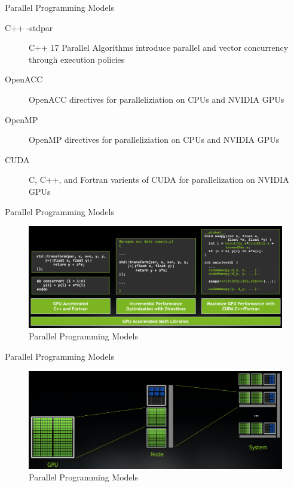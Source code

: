 \documentclass[aspectratio=169]{beamer}
\begin{document}
\begin{frame}{Parallel Programming Models}
\begin{description}
  \item[C++ -stdpar] C++ 17 Parallel Algorithms introduce parallel and vector concurrency through execution policies
  \item[OpenACC] OpenACC directives for paralleliziation on CPUs and NVIDIA GPUs
  \item[OpenMP] OpenMP directives for paralleliziation on CPUs and NVIDIA GPUs
  \item[CUDA] C, C++, and Fortran varients of CUDA for parallelization on NVIDIA GPUs
\end{description}
\end{frame}

\begin{frame}{Parallel Programming Models}
\begin{figure}
  \includegraphics[width=\linewidth]{figures/use_gpu.png}
  \caption{Parallel Programming Models}
\end{figure}
\end{frame}

\begin{frame}{Parallel Programming Models}
\begin{figure}
  \includegraphics[width=\linewidth]{figures/parallel.png}
  \caption{Parallel Programming Models}
\end{figure}
\end{frame}
\end{document}

